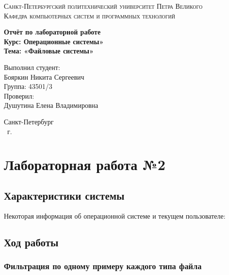 \documentclass[14pt,a4paper,report]{report}
\begin{document}
\def\contentsname{Содержание}

\begin{titlepage}
	\begin{center}
		\textsc{Санкт-Петербургский политехнический 
			университет Петра Великого\\[5mm]
			Кафедра компьютерных систем и программных технологий}
		
		\vfill
		
		\textbf{Отчёт по лабораторной работе\\[3mm]
			Курс: Операционные системы»\\[6mm]
			Тема: «Файловые системы»\\[35mm]
		}
	\end{center}
	
	\hfill
	\begin{minipage}{.5\textwidth}
		Выполнил студент:\\[2mm] 
		Бояркин Никита Сергеевич\\
		Группа: 43501/3\\[5mm]
		
		Проверил:\\[2mm] 
		Душутина Елена Владимировна
	\end{minipage}
	\vfill
	\begin{center}
		Санкт-Петербург\\ \the\year\ г.
	\end{center}
\end{titlepage}

\tableofcontents
\clearpage

\chapter{Лабораторная работа №2}

\section{Характеристики системы}

Некоторая информация об операционной системе и текущем пользователе:



\section{Ход работы}

\subsection{Фильтрация по одному примеру каждого типа файла}
\end{document}
